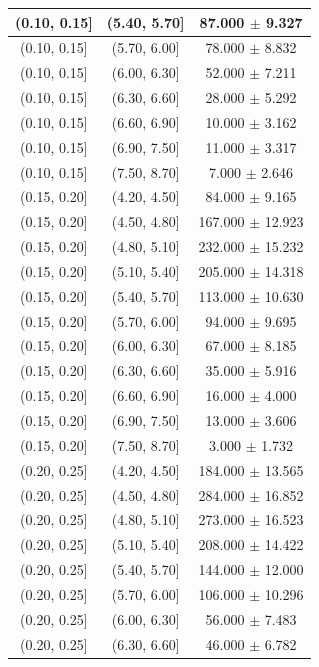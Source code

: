 \begin{longtable}{|c|c|c|}
\hline
(0.10, 0.15] & (5.40, 5.70] & 87.000 $\pm$ 9.327 \\ 
\hline
(0.10, 0.15] & (5.70, 6.00] & 78.000 $\pm$ 8.832 \\ 
\hline
(0.10, 0.15] & (6.00, 6.30] & 52.000 $\pm$ 7.211 \\ 
\hline
(0.10, 0.15] & (6.30, 6.60] & 28.000 $\pm$ 5.292 \\ 
\hline
(0.10, 0.15] & (6.60, 6.90] & 10.000 $\pm$ 3.162 \\ 
\hline
(0.10, 0.15] & (6.90, 7.50] & 11.000 $\pm$ 3.317 \\ 
\hline
(0.10, 0.15] & (7.50, 8.70] & 7.000 $\pm$ 2.646 \\ 
\hline
(0.15, 0.20] & (4.20, 4.50] & 84.000 $\pm$ 9.165 \\ 
\hline
(0.15, 0.20] & (4.50, 4.80] & 167.000 $\pm$ 12.923 \\ 
\hline
(0.15, 0.20] & (4.80, 5.10] & 232.000 $\pm$ 15.232 \\ 
\hline
(0.15, 0.20] & (5.10, 5.40] & 205.000 $\pm$ 14.318 \\ 
\hline
(0.15, 0.20] & (5.40, 5.70] & 113.000 $\pm$ 10.630 \\ 
\hline
(0.15, 0.20] & (5.70, 6.00] & 94.000 $\pm$ 9.695 \\ 
\hline
(0.15, 0.20] & (6.00, 6.30] & 67.000 $\pm$ 8.185 \\ 
\hline
(0.15, 0.20] & (6.30, 6.60] & 35.000 $\pm$ 5.916 \\ 
\hline
(0.15, 0.20] & (6.60, 6.90] & 16.000 $\pm$ 4.000 \\ 
\hline
(0.15, 0.20] & (6.90, 7.50] & 13.000 $\pm$ 3.606 \\ 
\hline
(0.15, 0.20] & (7.50, 8.70] & 3.000 $\pm$ 1.732 \\ 
\hline
(0.20, 0.25] & (4.20, 4.50] & 184.000 $\pm$ 13.565 \\ 
\hline
(0.20, 0.25] & (4.50, 4.80] & 284.000 $\pm$ 16.852 \\ 
\hline
(0.20, 0.25] & (4.80, 5.10] & 273.000 $\pm$ 16.523 \\ 
\hline
(0.20, 0.25] & (5.10, 5.40] & 208.000 $\pm$ 14.422 \\ 
\hline
(0.20, 0.25] & (5.40, 5.70] & 144.000 $\pm$ 12.000 \\ 
\hline
(0.20, 0.25] & (5.70, 6.00] & 106.000 $\pm$ 10.296 \\ 
\hline
(0.20, 0.25] & (6.00, 6.30] & 56.000 $\pm$ 7.483 \\ 
\hline
(0.20, 0.25] & (6.30, 6.60] & 46.000 $\pm$ 6.782 \\ 

\end{longtable}
